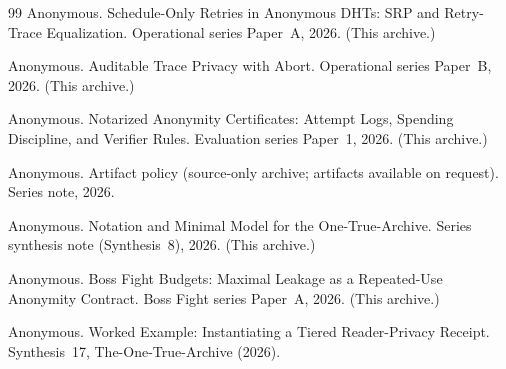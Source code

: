 \documentclass[11pt]{article}
\theoremstyle{definition}
\theoremstyle{remark}
\begin{document}
\begin{thebibliography}{99}
Anonymous.
\newblock Schedule-Only Retries in Anonymous DHTs: SRP and Retry-Trace Equalization.
\newblock Operational series Paper~A, 2026. (This archive.)

Anonymous.
\newblock Auditable Trace Privacy with Abort.
\newblock Operational series Paper~B, 2026. (This archive.)

Anonymous.
\newblock Notarized Anonymity Certificates: Attempt Logs, Spending Discipline, and Verifier Rules.
\newblock Evaluation series Paper~1, 2026. (This archive.)

Anonymous.
\newblock Artifact policy (source-only archive; artifacts available on request).
\newblock Series note, 2026.


Anonymous.
\newblock Notation and Minimal Model for the One-True-Archive.
\newblock Series synthesis note (Synthesis~8), 2026. (This archive.)

Anonymous.
\newblock Boss Fight Budgets: Maximal Leakage as a Repeated-Use Anonymity Contract.
\newblock Boss Fight series Paper~A, 2026. (This archive.)

Anonymous.
\newblock Worked Example: Instantiating a Tiered Reader-Privacy Receipt.
\newblock Synthesis~17, The-One-True-Archive (2026).

\end{thebibliography}
\end{document}

